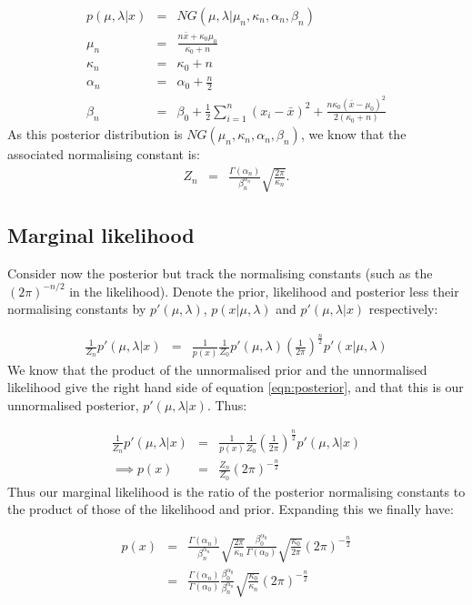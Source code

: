 \documentclass[12pt]{article} %
\begin{document}
	\begin{eqnarray}
	p(\mu, \lambda| x) &=& NG(\mu, \lambda | \mu_n, \kappa_n, \alpha_n, \beta_n) \\
	\mu_n &=& \frac{n\bar{x} + \kappa_0 \mu_0}{\kappa_0 + n} \\
	\kappa_n &=& \kappa_0 + n \\
	\alpha_n &=& \alpha_0 + \frac{n}{2} \\
	\beta_n &=& \beta_0 + \frac{1}{2}\sum_{i=1}^n(x_i - \bar{x})^2 + \frac{n\kappa_0\left(\bar{x} - \mu_0 \right)^2}{2(\kappa_0 + n)}
	\end{eqnarray}
	As this posterior distribution is $NG(\mu_n,\kappa_n, \alpha_n, \beta_n)$, we know that the associated normalising constant is:
	\begin{eqnarray}
	Z_n &=& \frac{\Gamma(\alpha_n)}{\beta_n^{\alpha_n}}\sqrt{\frac{2\pi}{\kappa_n}}.
	\end{eqnarray}
	
	\subsection{Marginal likelihood}
	Consider now the posterior but track the normalising constants (such as the $(2\pi)^{-n/2}$ in the likelihood). Denote the prior, likelihood and posterior less their normalising constants by $p'(\mu, \lambda)$, $p(x | \mu, \lambda)$ and $p'(\mu, \lambda | x)$ respectively:
	
	\begin{eqnarray}
	\frac{1}{Z_n} p'(\mu, \lambda | x) &=& \frac{1}{p(x)}\frac{1}{Z_0} p'(\mu, \lambda)\left(\frac{1}{2\pi}\right)^{\frac{n}{2}} p'(x | \mu, \lambda)
	\end{eqnarray}
	We know that the product of the unnormalised prior and the unnormalised likelihood give the right hand side of equation \ref{eqn:posterior}, and that this is our unnormalised posterior, $p'(\mu, \lambda | x)$. Thus:
	
	\begin{eqnarray}
	\frac{1}{Z_n} p'(\mu, \lambda | x) &=& \frac{1}{p(x)}\frac{1}{Z_0} \left(\frac{1}{2\pi}\right)^{\frac{n}{2}} p'(\mu, \lambda | x) \\
	\implies p(x) &=& \frac{Z_n}{Z_0}(2\pi)^{-\frac{n}{2}} 
	\end{eqnarray}
	Thus our marginal likelihood is the ratio of the posterior normalising constants to the product of those of the likelihood and prior. Expanding this we finally have:
	
	\begin{eqnarray}
	p(x) &=& \frac{\Gamma(\alpha_n)}{\beta_n^{\alpha_n}} \sqrt{\frac{2\pi}{\kappa_n}} \frac{\beta_0^{\alpha_0}}{\Gamma(\alpha_0)} \sqrt{\frac{\kappa_0}{2\pi}} (2\pi)^{-\frac{n}{2}} \\
	&=& \frac{\Gamma(\alpha_n)}{\Gamma(\alpha_0)}\frac{\beta_0^{\alpha_0}}{\beta_n^{\alpha_n}} \sqrt{\frac{\kappa_0}{\kappa_n}}(2\pi)^{-\frac{n}{2}}
	\end{eqnarray}

	
\end{document}
